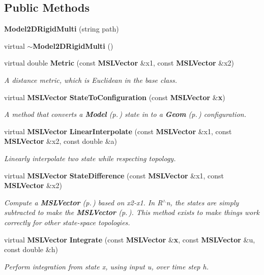 \subsection*{Public Methods}
\begin{CompactItemize}
\item 
{\bf Model2DRigid\-Multi} (string path)
\item 
virtual {\bf $\sim$Model2DRigid\-Multi} ()
\item 
virtual double {\bf Metric} (const {\bf MSLVector} \&x1, const {\bf MSLVector} \&x2)
\begin{CompactList}\small\item\em A distance metric, which is Euclidean in the base class.\item\end{CompactList}\item 
virtual {\bf MSLVector} {\bf State\-To\-Configuration} (const {\bf MSLVector} \&{\bf x})
\begin{CompactList}\small\item\em A method that converts a {\bf Model} {\rm (p.\,\pageref{classModel})} state in to a {\bf Geom} {\rm (p.\,\pageref{classGeom})} configuration.\item\end{CompactList}\item 
virtual {\bf MSLVector} {\bf Linear\-Interpolate} (const {\bf MSLVector} \&x1, const {\bf MSLVector} \&x2, const double \&a)
\begin{CompactList}\small\item\em Linearly interpolate two state while respecting topology.\item\end{CompactList}\item 
virtual {\bf MSLVector} {\bf State\-Difference} (const {\bf MSLVector} \&x1, const {\bf MSLVector} \&x2)
\begin{CompactList}\small\item\em Compute a {\bf MSLVector} {\rm (p.\,\pageref{classMSLVector})} based on x2-x1. In R$^\wedge$n, the states are simply subtracted to make the {\bf MSLVector} {\rm (p.\,\pageref{classMSLVector})}. This method exists to make things work correctly for other state-space topologies.\item\end{CompactList}\item 
virtual {\bf MSLVector} {\bf Integrate} (const {\bf MSLVector} \&{\bf x}, const {\bf MSLVector} \&u, const double \&h)
\begin{CompactList}\small\item\em Perform integration from state x, using input u, over time step h.\item\end{CompactList}\end{CompactItemize}
